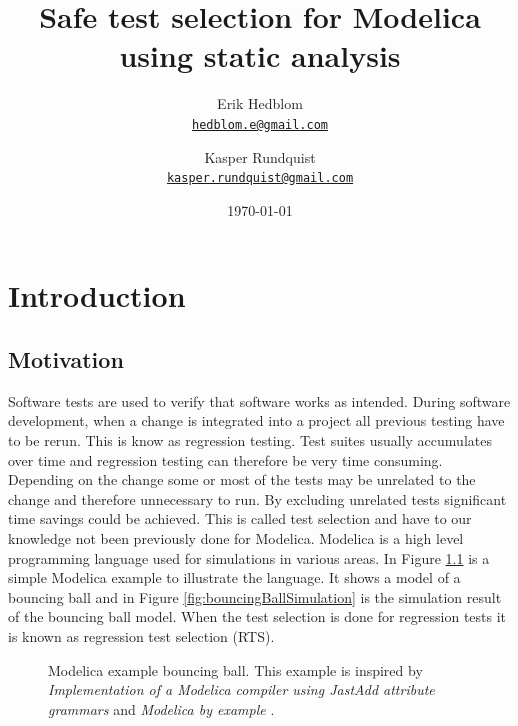 \documentclass{cslthse-msc}
\author{
	Erik Hedblom \\
	{\normalsize \href{mailto:hedblom.e@gmail.com}{\texttt{hedblom.e@gmail.com}}}
	\and
	Kasper Rundquist \\
	{\normalsize \href{mailto:kasper.rundquist@gmail.com}{\texttt{kasper.rundquist@gmail.com}}}
}
\title{Safe test selection for Modelica using static analysis}
\date{\today}
\begin{document}
\makefrontmatter
\chapter[Introduction]{Introduction}


\section{Motivation}
Software tests are used to verify that software works as intended.
During software development, when a change is integrated into a project all previous testing have to be rerun. \cite{DBLP:conf/sigsoft/LegunsenHSLZM16, haider2016safe} This is know as regression testing. Test suites usually accumulates over time and regression testing can therefore be very time consuming. Depending on the change some or most of the tests may be unrelated to the change and therefore unnecessary to run. By excluding unrelated tests significant time savings could be achieved. This is called test selection and have to our knowledge not been previously done for Modelica. Modelica is a high level programming language used for simulations in various areas. In Figure \ref{fig:bouncingBallCode} is a simple Modelica example to illustrate the language. It shows a model of a bouncing ball and in Figure \ref{fig:bouncingBallSimulation} is the simulation result of the bouncing ball model. When the test selection is done for regression tests it is known as regression test selection (RTS). 

\begin{figure}[!htbp]
    \centering
    
    \caption{Modelica example bouncing ball. This example is inspired by \textit{Implementation of a Modelica compiler using JastAdd attribute grammars} \cite{aakesson2010implementation} and \textit{Modelica by example} \cite{tillermodelica}.}
    \label{fig:bouncingBallCode}
\end{figure}
\end{document}
